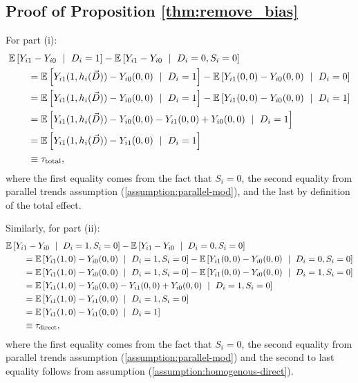 \documentclass[11pt]{article}
\begin{document}
\subsection{Proof of Proposition \ref{thm:remove_bias}}

For part (i):
\begin{align*}
    &\expec{Y_{i1} - Y_{i0} \ \mid \ D_i = 1} - \expec{Y_{i1} - Y_{i0} \ \mid \ D_i = 0, S_i = 0} \\
    &\quad\quad= \expec{Y_{i1}(1, h_i(\vec{D})) - Y_{i0}(0,0) \ \mid \ D_i = 1} - \expec{Y_{i1}(0, 0) - Y_{i0}(0,0) \ \mid \ D_i = 0} \\
    &\quad\quad= \expec{Y_{i1}(1, h_i(\vec{D})) - Y_{i0}(0,0) \ \mid \ D_i = 1} - \expec{Y_{i1}(0, 0) - Y_{i0}(0,0) \ \mid \ D_i = 1} \\
    &\quad\quad= \expec{Y_{i1}(1, h_i(\vec{D})) - Y_{i0}(0,0) - Y_{i1}(0, 0) + Y_{i0}(0,0) \ \mid \ D_i = 1} \\
    &\quad\quad= \expec{Y_{i1}(1, h_i(\vec{D})) - Y_{i1}(0, 0) \ \mid \ D_i = 1} \\
    &\quad\quad\equiv \tau_{\text{total}},
\end{align*}
where the first equality comes from the fact that $S_i = 0$, the second equality from parallel trends assumption (\ref{assumption:parallel-mod}), and the last by definition of the total effect.

Similarly, for part (ii):
\begin{align*}
    &\mathbb{E}\left[Y_{i1} - Y_{i0} \ \mid \ D_i = 1, S_i = 0\right] - \mathbb{E}\left[Y_{i1} - Y_{i0} \ \mid \ D_i = 0, S_i = 0\right] \\
    &\quad\quad= \mathbb{E}\left[Y_{i1}(1, 0) - Y_{i0}(0,0) \ \mid \ D_i = 1, S_i = 0\right] - \mathbb{E}\left[Y_{i1}(0, 0) - Y_{i0}(0,0) \ \mid \ D_i = 0, S_i = 0\right] \\
    &\quad\quad= \mathbb{E}\left[Y_{i1}(1, 0) - Y_{i0}(0,0) \ \mid \ D_i = 1, S_i = 0\right] - \mathbb{E}\left[Y_{i1}(0, 0) - Y_{i0}(0,0) \ \mid \ D_i = 1, S_i = 0\right] \\
    &\quad\quad= \mathbb{E}\left[Y_{i1}(1, 0) - Y_{i0}(0,0) - Y_{i1}(0, 0) + Y_{i0}(0,0) \ \mid \ D_i = 1, S_i = 0\right] \\
    &\quad\quad= \mathbb{E}\left[Y_{i1}(1, 0) - Y_{i1}(0, 0) \ \mid \ D_i = 1, S_i = 0\right] \\
    &\quad\quad= \mathbb{E}\left[Y_{i1}(1, 0) - Y_{i1}(0, 0) \ \mid \ D_i = 1\right] \\
    &\quad\quad\equiv \tau_{\text{direct}},
\end{align*}
where the first equality comes from the fact that $S_i = 0$, the second equality from parallel trends assumption (\ref{assumption:parallel-mod}) and 
the second to last equality follows from assumption (\ref{assumption:homogenous-direct}).
\end{document}
